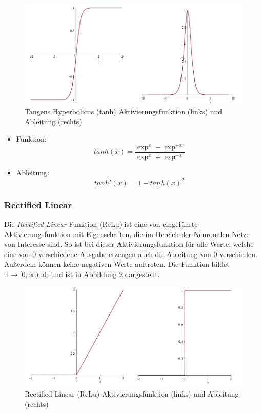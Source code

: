  \begin{figure}[H]
 \centering
 \includegraphics[width=0.6\linewidth]{images/2_tanh}
 \caption[Tangens Hyperbolicus (tanh) Aktivierungsfunktion und Ableitung]{Tangens Hyperbolicus (tanh) Aktivierungsfunktion (links) und Ableitung (rechts)}
 \label{fig:2_tanh}
 \end{figure}
 
  \begin{itemize}
  \item Funktion: 
	  \begin{equation} 
	  tanh(x) = \frac{\exp^x - \exp^{-x}}{\exp^x + \exp^{-x}} 
	  \end{equation}
  \item Ableitung: 
  \begin{equation} 
  	tanh'(x) =1 - tanh(x)^2 
  	\end{equation}
  \end{itemize}

\subsubsection{Rectified Linear}
Die \textit{Rectified Linear}-Funktion (ReLu) ist eine von \cite{Glorot2011} eingeführte Aktivierungsfunktion mit Eigenschaften, die im Bereich der Neuronalen Netze von Interesse sind. So ist bei dieser Aktivierungsfunktion für alle Werte, welche eine von 0 verschiedene Ausgabe erzeugen auch die Ableitung von 0 verschieden. Außerdem können keine negativen Werte auftreten. Die Funktion bildet $\mathbb{R} \rightarrow [0,\infty) $ ab und ist in Abbildung \ref{fig:2_relu} dargestellt.

 \begin{figure}[H]
 \centering
 \includegraphics[width=0.6\linewidth]{images/2_relu}
 \caption[Rectified Linear (ReLu) Aktivierungsfunktion und Ableitung]{Rectified Linear (ReLu) Aktivierungsfunktion (links) und Ableitung (rechts)}
 \label{fig:2_relu}
 \end{figure}
 

